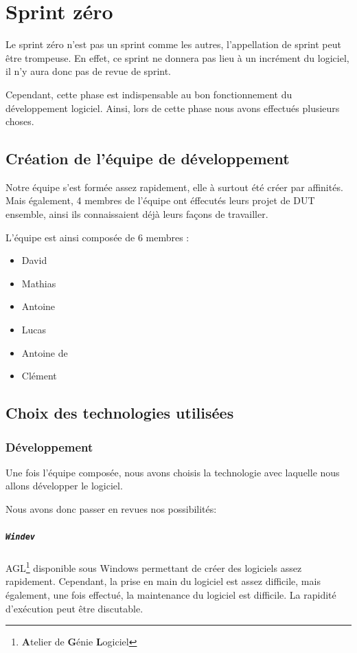 \chapter{Sprint zéro}\label{sprintzero}
Le sprint zéro n'est pas un sprint comme les autres, l'appellation de sprint peut être trompeuse. 
En effet, ce sprint ne donnera pas lieu à un incrément du logiciel, il n'y aura donc pas de revue de sprint. 

Cependant, cette phase est indispensable au bon fonctionnement du développement logiciel. 
Ainsi, lors de cette phase nous avons effectués plusieurs choses.

\section{Création de l'équipe de développement}
Notre équipe s'est formée assez rapidement, elle à surtout été créer par affinités. Mais également, 4 membres
de l'équipe ont éffecutés leurs projet de DUT ensemble, ainsi ils connaissaient déjà leurs façons de travailler.

L'équipe est ainsi composée de 6 membres : 
\begin{itemize}
	\item David 
	\item Mathias 
	\item Antoine 
	\item Lucas 
	\item Antoine de 
	\item Clément 
\end{itemize}

\section{Choix des technologies utilisées}\label{choixTechno}
	\subsection{Développement}
		Une fois l'équipe composée, nous avons choisis la technologie avec laquelle nous allons développer le logiciel.
	 
		Nous avons donc passer en revues nos possibilités: 
		\paragraph{\texttt{Windev}} AGL\footnote{\textbf{A}telier de \textbf{G}énie \textbf{L}ogiciel} disponible sous Windows permettant de créer des logiciels
		assez rapidement. Cependant, la prise en main du logiciel est assez difficile, mais également, une fois effectué, la maintenance du logiciel
		est difficile. La rapidité d'exécution peut être discutable. 

